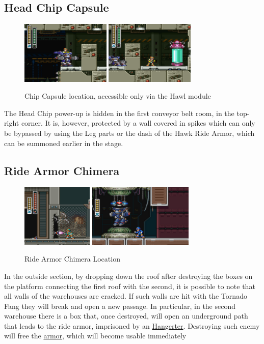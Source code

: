 \subsection{Head Chip Capsule}
\begin{figure}[htp]
	\centering
	\includegraphics[height=3cm]{figures/X3/Blast_hornet/Armor_1.png}
	\includegraphics[height=3cm]{figures/X3/Blast_hornet/Armor_2.png}
	\caption{Chip Capsule location, accessible only via the Hawl module}
\end{figure}

The Head Chip power-up is hidden in the first conveyor belt room, in the top-right corner. It is, however, protected by a wall covered in spikes which can only be bypassed by using the Leg parts or the dash of the Hawk Ride Armor, which can be summoned earlier in the stage.

\subsection{Ride Armor Chimera}
\begin{figure}[htp]
	\centering
	\includegraphics[height=3cm]{figures/X3/Blast_hornet/Ride_2.jpg}
	\includegraphics[height=3cm]{figures/X3/Blast_hornet/Ride_3.jpg}
	\caption{Ride Armor Chimera Location}
\end{figure}
In the outside section, by dropping down the roof after destroying the boxes on the platform connecting the first roof with the second, it is possible to note that all walls of the warehouses are cracked. If such walls are hit with the Tornado Fang they will break and open a new passage. In particular, in the second warehouse there is a box that, once destroyed, will open an underground path that leads to the ride armor, imprisoned by an \hyperlink{enem:Hangerter}{Hangerter}. Destroying such enemy will free the \hyperlink{vehicle:Ride_Armor_Chimera}{armor}, which will become usable immediately




